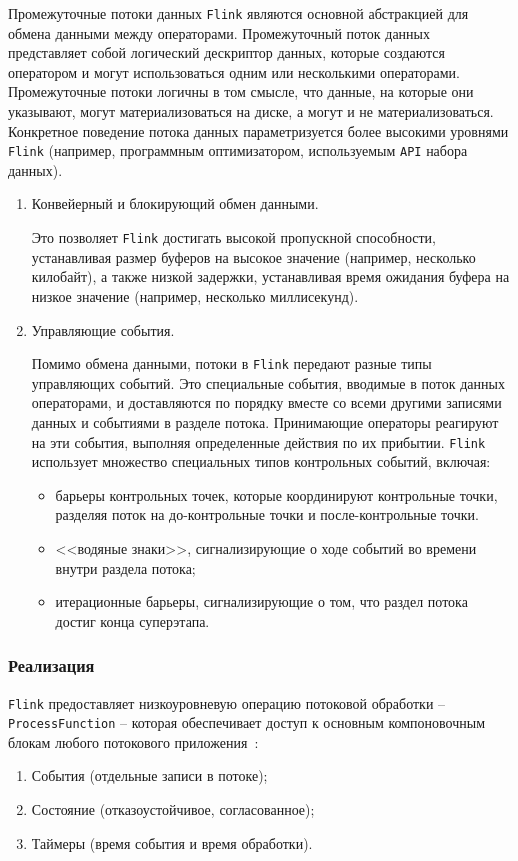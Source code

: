 Промежуточные потоки данных \texttt{Flink} являются основной абстракцией для обмена данными между операторами. 
Промежуточный поток данных представляет собой логический дескриптор данных, которые создаются оператором и могут использоваться одним или несколькими операторами.
Промежуточные потоки логичны в том смысле, что данные, на которые они указывают, могут материализоваться на диске, а могут и не материализоваться. 
Конкретное поведение потока данных параметризуется более высокими уровнями \texttt{Flink} (например, программным оптимизатором, используемым \texttt{API} набора данных).

\begin{enumerate}
  \item Конвейерный и блокирующий обмен данными.

    Это позволяет \texttt{Flink} достигать высокой пропускной способности, устанавливая размер буферов на высокое значение (например, несколько килобайт), а также низкой задержки, устанавливая время ожидания буфера на низкое значение (например, несколько миллисекунд).
  \item Управляющие события.

    Помимо обмена данными, потоки в \texttt{Flink} передают разные типы управляющих событий. 
    Это специальные события, вводимые в поток данных операторами, и доставляются по порядку вместе со всеми другими записями данных и событиями в разделе потока. 
    Принимающие операторы реагируют на эти события, выполняя определенные действия по их прибытии. 
    \texttt{Flink} использует множество специальных типов контрольных событий, включая:
    \begin{itemize}
      \item барьеры контрольных точек, которые координируют контрольные точки, разделяя поток на до-контрольные точки и после-контрольные точки.
      \item <<водяные знаки>>, сигнализирующие о ходе событий во времени внутри раздела потока;
      \item итерационные барьеры, сигнализирующие о том, что раздел потока достиг конца суперэтапа.
    \end{itemize}
\end{enumerate}

\subsubsection{Реализация}

\texttt{Flink} предоставляет низкоуровневую операцию потоковой обработки -- \texttt{ProcessFunction} -- которая обеспечивает доступ к основным компоновочным блокам любого потокового приложения~\cite{flink-oreilly}:
\begin{enumerate}
  \item События (отдельные записи в потоке);
  \item Состояние (отказоустойчивое, согласованное);
  \item Таймеры (время события и время обработки).
\end{enumerate}

